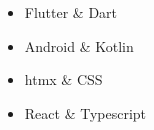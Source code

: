 \begin{itemize}
    \item Flutter \& Dart
    \item Android \& Kotlin
    \item htmx \& CSS
    \item React \& Typescript

\end{itemize}